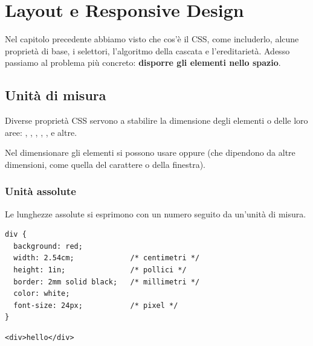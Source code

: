 \chapter{Layout e Responsive Design}

Nel capitolo precedente abbiamo visto che cos'è il CSS, come includerlo, alcune
proprietà di base, i selettori, l'algoritmo della cascata e l'ereditarietà.
Adesso passiamo al problema più concreto: \textbf{disporre gli elementi nello
spazio}.

\section{Unità di misura}

Diverse proprietà CSS servono a stabilire la dimensione degli elementi o delle
loro aree: , , , ,
,  e altre.

Nel dimensionare gli elementi si possono usare  oppure
 (che dipendono da altre dimensioni, come quella del
carattere o della finestra).

\subsection{Unità assolute}

Le lunghezze assolute si esprimono con un numero seguito da un'unità di misura.

\begin{affianco}[0.55]
\begin{lstlisting}[style=css, name=assolute.css]
div {
  background: red;
  width: 2.54cm;             /* centimetri */
  height: 1in;               /* pollici */
  border: 2mm solid black;   /* millimetri */
  color: white;
  font-size: 24px;           /* pixel */
}
\end{lstlisting}
\begin{lstlisting}[style=html, name=assolute.html]
<div>hello</div>
\end{lstlisting}
\risultato
\begin{browser}
\end{browser}
\end{affianco}

